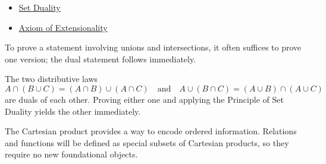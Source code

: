\begin{dependencies}
\begin{itemize}
  \item \hyperref[def:set-duality]{Set Duality}
  \item \hyperref[ax:extensionality]{Axiom of Extensionality}
\end{itemize}
\end{dependencies}

\begin{remark*}
To prove a statement involving unions and intersections, it often suffices to
prove one version; the dual statement follows immediately.
\end{remark*}

\begin{example*}
The two distributive laws
\[
A \cap (B \cup C) = (A \cap B) \cup (A \cap C)
\quad\text{and}\quad
A \cup (B \cap C) = (A \cup B) \cap (A \cup C)
\]
are duals of each other. Proving either one and applying the Principle of Set
Duality yields the other immediately.
\end{example*}

\begin{remark*}
The Cartesian product provides a way to encode ordered information.
Relations and functions will be defined as special subsets of Cartesian
products, so they require no new foundational objects.
\end{remark*}
